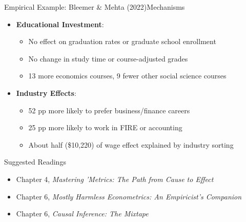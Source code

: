 \documentclass[hyperref={pdfpagelabels=false}]{beamer}
\begin{document}
\begin{frame}{Empirical Example: Bleemer \& Mehta (2022)}{Mechanisms}
	\begin{itemize}
		\item \textbf{Educational Investment}:
										\vspace{0.2cm}
		\begin{itemize}
			\item No effect on graduation rates or graduate school enrollment
											\vspace{0.2cm}
			\item No change in study time or course-adjusted grades
											\vspace{0.2cm}
			\item 13 more economics courses, 9 fewer other social science courses
											\vspace{0.2cm}
		\end{itemize}
		
		\vspace{0.2cm}
		\item \textbf{Industry Effects}:
										\vspace{0.2cm}
		\begin{itemize}
			\item 52 pp more likely to prefer business/finance careers
											\vspace{0.2cm}
			\item 25 pp more likely to work in FIRE or accounting
											\vspace{0.2cm}
			\item About half (\$10,220) of wage effect explained by industry sorting
		\end{itemize}
		
		\vspace{0.2cm}
	\end{itemize}
\end{frame}
\begin{frame}{Suggested Readings} %
	\begin{itemize} 
		\item Chapter 4, \textit{Mastering 'Metrics: The Path from Cause to Effect}
		\vspace{0.2cm}
		\item Chapter 6, \textit{Mostly Harmless Econometrics: An Empiricist's Companion} %
		\vspace{0.2cm}
		\item Chapter 6, \textit{Causal Inference: The Mixtape}
	\end{itemize}
\end{frame}
\end{document}
